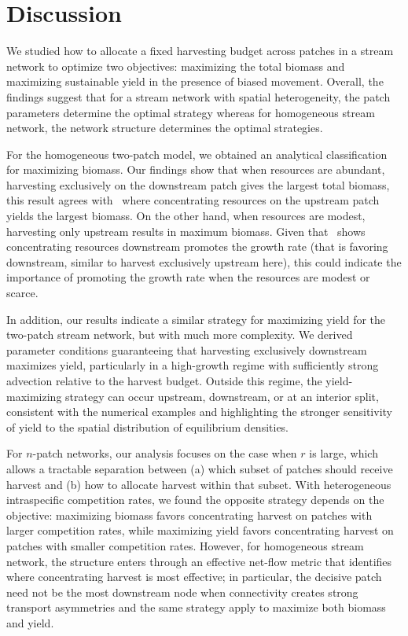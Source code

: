 \documentclass[11pt]{article}
\theoremstyle{definition}
\begin{document}
\section{Discussion}\label{section discussion}




We studied how to allocate a fixed harvesting budget across patches in a stream network to optimize two objectives: maximizing the total biomass and maximizing sustainable yield in the presence of biased movement. Overall, the findings suggest that for a stream network with spatial heterogeneity, the patch parameters determine the optimal strategy whereas for homogeneous stream network, the network structure determines the optimal strategies.  

For the homogeneous two-patch model, we obtained an analytical classification for maximizing biomass. Our findings show that when resources are abundant, harvesting exclusively on the downstream patch gives the largest total biomass, this result agrees with~\cite{nguyen2023maximizing} where concentrating resources on the upstream patch yields the largest biomass. On the other hand, when resources are modest, harvesting only upstream results in maximum biomass. Given that~\cite{nguyen2023maximizing} shows concentrating resources downstream promotes the growth rate (that is favoring downstream, similar to harvest exclusively upstream here), this could indicate the importance of promoting the growth rate when the resources are modest or scarce. 


In addition, our results indicate a similar strategy for maximizing yield for the two-patch stream network, but with much more complexity. We derived parameter conditions guaranteeing that harvesting exclusively downstream maximizes yield, particularly in a high-growth regime with sufficiently strong advection relative to the harvest budget. Outside this regime, the yield-maximizing strategy can occur upstream, downstream, or at an interior split, consistent with the numerical examples and highlighting the stronger sensitivity of yield to the spatial distribution of equilibrium densities.

For $n$-patch networks, our analysis focuses on the case when $r$ is large, which allows a tractable separation between (a) which subset of patches should receive harvest and (b) how to allocate harvest within that subset. With heterogeneous intraspecific competition rates, we found the opposite strategy depends on the objective: maximizing  biomass favors concentrating harvest on patches with larger competition rates, while maximizing yield favors concentrating harvest on patches with smaller competition rates. However, for homogeneous stream network, the structure enters through an effective net-flow metric that identifies where concentrating harvest is most effective; in particular, the decisive patch need not be the most downstream node when connectivity creates strong transport asymmetries and the same strategy apply to maximize both biomass and yield.
\end{document}
